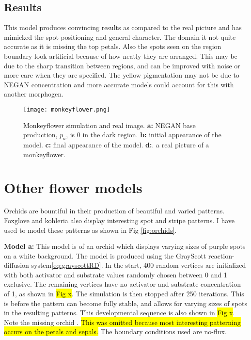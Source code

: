 \subsection*{Results}
This model produces convincing results as compared to the real picture and has mimicked the spot positioning and general character. The domain it not quite accurate as it is missing the top petals. Also the spots seen on the region boundary look artificial because of how neatly they are arranged. This may be due to the sharp transition between regions, and can be improved with noise or more care when they are specified. The yellow pigmentation may not be due to NEGAN concentration and more accurate models could account for this with another morphogen.

\begin{figure}[ht]
	\centering
	\texttt{[image: monkeyflower.png]}
	\caption{Monkeyflower simulation and real image. \textbf{a:} NEGAN base production, $p_a$, is 0 in the dark region. \textbf{b:} initial appearance of the model. \textbf{c:} final appearance of the model. \textbf{d:}. a real picture of a monkeyflower.}
	\label{fig:monkeyflower}
\end{figure}

\section{Other flower models}
Orchids are bountiful in their production of beautiful and varied patterns. Foxglove and kohleria also display interesting spot and stripe patterns. I have used \ProgramName{} to model these patterns as shown in Fig \ref{fig:orchids}. 

\textbf{Model a:} 
This model is of an orchid which displays varying sizes of purple spots on a white background. The model is produced using the GrayScott reaction-diffusion system\ref{eq:grayscottRD}. In the start, 400 random vertices are initialized with both activator and substrate values randomly chosen between 0 and 1 exclusive. The remaining vertices have no activator and substrate concentration of 1, as shown in \hl{Fig x}. The simulation is then stopped after 250 iterations. This is before the pattern can become fully stable, and allows for varying sizes of spots in the resulting patterns. This developmental sequence is also shown in \hl{Fig x}. Note the missing orchid . \hl{This was omitted because most interesting patterning occurs on the petals and sepals.} The boundary conditions used are no-flux.

